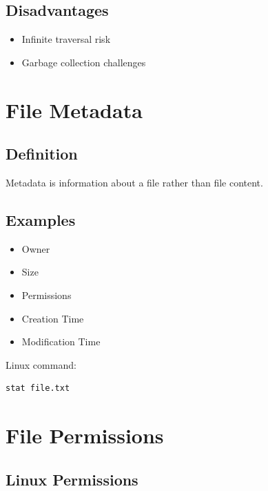 \subsection{Disadvantages}

\begin{itemize}
\item Infinite traversal risk
\item Garbage collection challenges
\end{itemize}

\section{File Metadata}

\subsection{Definition}

Metadata is information about a file rather than file content.

\subsection{Examples}

\begin{itemize}
\item Owner
\item Size
\item Permissions
\item Creation Time
\item Modification Time
\end{itemize}

Linux command:

\begin{verbatim}
stat file.txt
\end{verbatim}

\section{File Permissions}

\subsection{Linux Permissions}

